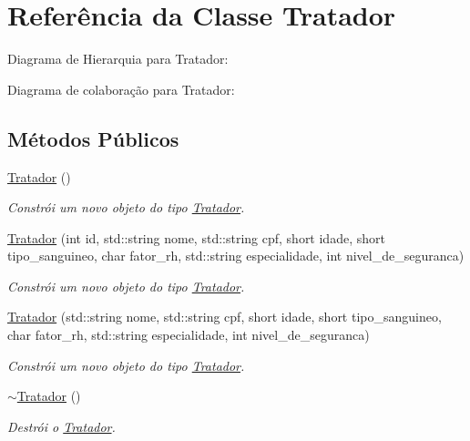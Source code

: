 \hypertarget{classTratador}{}\section{Referência da Classe Tratador}
\label{classTratador}


Diagrama de Hierarquia para Tratador\+:


Diagrama de colaboração para Tratador\+:
\subsection*{Métodos Públicos}
\begin{DoxyCompactItemize}
\item 
\mbox{\label{classTratador_a4339bfc1e32968609401440338eeba20}} 
\hyperlink{classTratador_a4339bfc1e32968609401440338eeba20}{Tratador} ()
\begin{DoxyCompactList}\small\item\em Constrói um novo objeto do tipo \hyperlink{classTratador}{Tratador}. \end{DoxyCompactList}\item 
\hyperlink{classTratador_ac77f42836921173475b8e5f98807505e}{Tratador} (int id, std\+::string nome, std\+::string cpf, short idade, short tipo\+\_\+sanguineo, char fator\+\_\+rh, std\+::string especialidade, int nivel\+\_\+de\+\_\+seguranca)
\begin{DoxyCompactList}\small\item\em Constrói um novo objeto do tipo \hyperlink{classTratador}{Tratador}. \end{DoxyCompactList}\item 
\hyperlink{classTratador_af4d95e52e508d7204fc8c93b3ec5e637}{Tratador} (std\+::string nome, std\+::string cpf, short idade, short tipo\+\_\+sanguineo, char fator\+\_\+rh, std\+::string especialidade, int nivel\+\_\+de\+\_\+seguranca)
\begin{DoxyCompactList}\small\item\em Constrói um novo objeto do tipo \hyperlink{classTratador}{Tratador}. \end{DoxyCompactList}\item 
\mbox{\label{classTratador_a8750ed6960e786da5d6f87e05b491093}} 
\hyperlink{classTratador_a8750ed6960e786da5d6f87e05b491093}{$\sim$\+Tratador} ()
\begin{DoxyCompactList}\small\item\em Destrói o \hyperlink{classTratador}{Tratador}. \end{DoxyCompactList}\item 

\end{DoxyCompactItemize}
